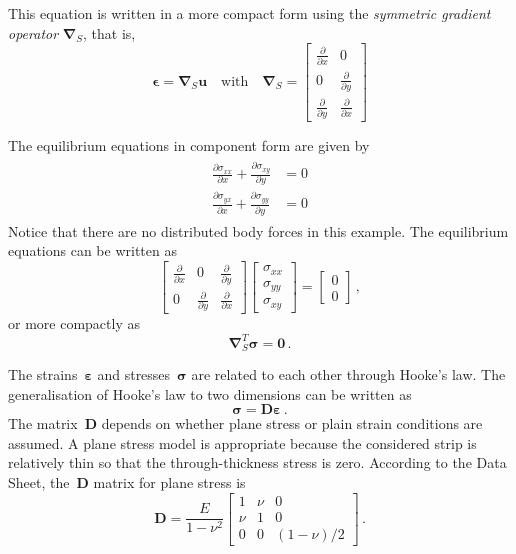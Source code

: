 \documentclass[11pt,a4paper]{article}
\newcommand{\fett}[1]{\boldsymbol{#1}}
\renewcommand{\vec}[1]{\fett{#1}}
\begin{document}
%
This equation is written in a more compact form using the {\em symmetric gradient operator} $\vec\nabla_S $, that is,
%
\begin{equation}
\vec \epsilon = \vec \nabla_S \vec u  \quad \text{with} \quad \vec \nabla_S =
\begin{bmatrix}
\frac{\partial }{\partial x} & 0 \\[0.3em]  
0 & \frac{\partial }{\partial y} \\[0.3em]  
\frac{\partial }{\partial y} & \frac{\partial }{\partial x}
\end{bmatrix}
\end{equation}
%

The equilibrium equations in component form are given by 
%
\begin{align}
\begin{split}
\frac{\partial \sigma_{xx}}{\partial x} + \frac{\partial \sigma_{xy}}{\partial y}  & = 0 \\
\frac{\partial \sigma_{yx}}{\partial x} + \frac{\partial \sigma_{yy}}{\partial y} &=0
\end{split}
\end{align}
%
Notice that there are no distributed body forces in this example.  The equilibrium equations can be written as 
%
\begin{equation}
\begin{bmatrix}
\frac{\partial }{\partial x}  & 0 & \frac{\partial }{\partial y} \\[0.3em] 
0 & \frac{\partial }{\partial y} & \frac{\partial }{\partial x}
\end{bmatrix}
\begin{bmatrix}
\sigma_{xx}  \\ \sigma_{yy} \\ \sigma_{xy}
\end{bmatrix}
= 
\begin{bmatrix}
0 \\ 0 
\end{bmatrix} \, , 
\end{equation} 
%
or more compactly as 
%
%
\begin{equation}
 \vec \nabla_S^T \fett \sigma  = \vec 0 \, .
\end{equation}
%
%


The strains~$\vec \varepsilon$ and stresses~$\vec \sigma$ are related to each other through  Hooke's law.  The generalisation of Hooke's law to two dimensions can be written as
%
\begin{equation}
	\vec \sigma = \vec D \vec \varepsilon \, .
\end{equation}
%
The matrix~$\vec D$ depends on whether plane stress or plain strain conditions are assumed. A plane stress model is appropriate because the considered strip is relatively thin so that the through-thickness stress is zero. According to the Data Sheet, the~$\vec D$ matrix for plane stress is 
%
\begin{equation}
\vec D = \frac{E}{1-\nu^2} 
\begin{bmatrix}
1 & \nu & 0 \\
\nu & 1 & 0 \\
0 & 0 & (1-\nu)/2
\end{bmatrix} \, .
\end{equation} 
% 
\end{document}
